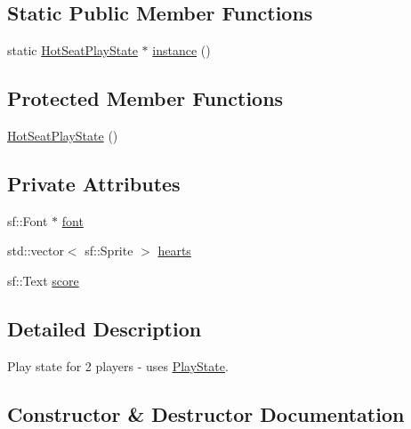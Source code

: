 \subsection*{Static Public Member Functions}
\begin{DoxyCompactItemize}
\item 
static \mbox{\hyperlink{class_hot_seat_play_state}{Hot\+Seat\+Play\+State}} $\ast$ \mbox{\hyperlink{class_hot_seat_play_state_a2a0510cffde2533a6b8c9e02fa299302}{instance}} ()
\end{DoxyCompactItemize}
\subsection*{Protected Member Functions}
\begin{DoxyCompactItemize}
\item 
\mbox{\hyperlink{class_hot_seat_play_state_a634bf50c77bcff048ac47ec11d7e1ea4}{Hot\+Seat\+Play\+State}} ()
\end{DoxyCompactItemize}
\subsection*{Private Attributes}
\begin{DoxyCompactItemize}
\item 
sf\+::\+Font $\ast$ \mbox{\hyperlink{class_hot_seat_play_state_a6a34ef6a18051ddf5578f70c125dcf1c}{font}}
\item 
std\+::vector$<$ sf\+::\+Sprite $>$ \mbox{\hyperlink{class_hot_seat_play_state_a056e1531092623f0e86672a3eb36d57e}{hearts}}
\item 
sf\+::\+Text \mbox{\hyperlink{class_hot_seat_play_state_aa96059a935490b4552002b97fd75667a}{score}}
\end{DoxyCompactItemize}


\subsection{Detailed Description}
Play state for 2 players -\/ uses \mbox{\hyperlink{class_play_state}{Play\+State}}. 

\subsection{Constructor \& Destructor Documentation}
\mbox{\label{class_hot_seat_play_state_a634bf50c77bcff048ac47ec11d7e1ea4}} 

